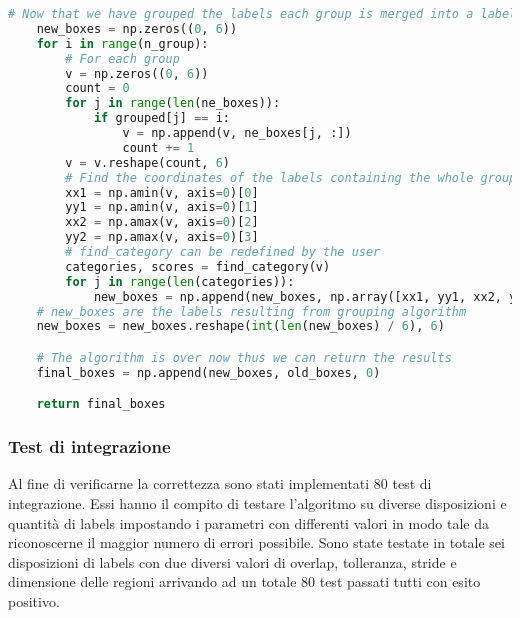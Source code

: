 \begin{lstlisting}[language=Python, caption=Python example]
    # Now that we have grouped the labels each group is merged into a label containing all of them
    new_boxes = np.zeros((0, 6))
    for i in range(n_group):
        # For each group
        v = np.zeros((0, 6))
        count = 0
        for j in range(len(ne_boxes)):
            if grouped[j] == i:
                v = np.append(v, ne_boxes[j, :])
                count += 1
        v = v.reshape(count, 6)
        # Find the coordinates of the labels containing the whole group
        xx1 = np.amin(v, axis=0)[0]
        yy1 = np.amin(v, axis=0)[1]
        xx2 = np.amax(v, axis=0)[2]
        yy2 = np.amax(v, axis=0)[3]
        # find_category can be redefined by the user
        categories, scores = find_category(v)
        for j in range(len(categories)):
            new_boxes = np.append(new_boxes, np.array([xx1, yy1, xx2, yy2, categories[j], scores[j]]))
    # new_boxes are the labels resulting from grouping algorithm
    new_boxes = new_boxes.reshape(int(len(new_boxes) / 6), 6)

    # The algorithm is over now thus we can return the results
    final_boxes = np.append(new_boxes, old_boxes, 0)

    return final_boxes
\end{lstlisting}
\subsubsection{Test di integrazione}
Al fine di verificarne la correttezza sono stati implementati 80 test di integrazione. Essi hanno il compito di testare l'algoritmo su diverse disposizioni e quantità di labels impostando i parametri con differenti valori in modo tale da riconoscerne il maggior numero di errori possibile. Sono state testate in totale sei disposizioni di labels con due diversi valori di overlap, tolleranza, stride e dimensione delle regioni arrivando ad un totale 80 test passati tutti con esito positivo.

